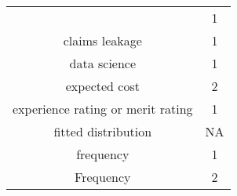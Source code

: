 \documentclass[]{book}
\begin{document}
\begin{longtable}[]{@{}cc@{}}
\begin{minipage}[t]{0.43\columnwidth}
\end{minipage} & \begin{minipage}[t]{0.05\columnwidth}\centering\strut
1\strut
\end{minipage}\tabularnewline
\begin{minipage}[t]{0.43\columnwidth}\centering\strut
claims leakage\strut
\end{minipage} & \begin{minipage}[t]{0.05\columnwidth}\centering\strut
1\strut
\end{minipage}\tabularnewline
\begin{minipage}[t]{0.43\columnwidth}\centering\strut
data science\strut
\end{minipage} & \begin{minipage}[t]{0.05\columnwidth}\centering\strut
1\strut
\end{minipage}\tabularnewline
\begin{minipage}[t]{0.43\columnwidth}\centering\strut
expected cost\strut
\end{minipage} & \begin{minipage}[t]{0.05\columnwidth}\centering\strut
2\strut
\end{minipage}\tabularnewline
\begin{minipage}[t]{0.43\columnwidth}\centering\strut
experience rating or merit rating\strut
\end{minipage} & \begin{minipage}[t]{0.05\columnwidth}\centering\strut
1\strut
\end{minipage}\tabularnewline
\begin{minipage}[t]{0.43\columnwidth}\centering\strut
fitted distribution\strut
\end{minipage} & \begin{minipage}[t]{0.05\columnwidth}\centering\strut
NA\strut
\end{minipage}\tabularnewline
\begin{minipage}[t]{0.43\columnwidth}\centering\strut
frequency\strut
\end{minipage} & \begin{minipage}[t]{0.05\columnwidth}\centering\strut
1\strut
\end{minipage}\tabularnewline
\begin{minipage}[t]{0.43\columnwidth}\centering\strut
Frequency\strut
\end{minipage} & \begin{minipage}[t]{0.05\columnwidth}\centering\strut
2\strut
\end{minipage}\tabularnewline

\end{longtable}
\end{document}
